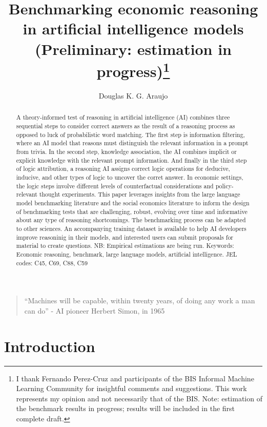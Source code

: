 \documentclass[
]{article}
\title{Benchmarking economic reasoning in artificial intelligence models
(Preliminary: estimation in progress)\thanks{I thank Fernando Perez-Cruz
and participants of the BIS Informal Machine Learning Community for
insightful comments and suggestions. This work represents my opinion and
not necessarily that of the BIS. Note: estimation of the benchmark
results in progress; results will be included in the first complete
draft.}}
\author{Douglas K. G. Araujo}
\affil{%
                  Bank for International
Settlements, douglas.araujo@bis.org
              }
\date{}
\begin{document}
\maketitle
\begin{abstract}
A theory-informed test of reasoning in artificial intelligence (AI)
combines three sequential steps to consider correct answers as the
result of a reasoning process as opposed to luck of probabilistic word
matching. The first step is information filtering, where an AI model
that reasons must distinguish the relevant information in a prompt from
trivia. In the second step, knowledge association, the AI combines
implicit or explicit knowledge with the relevant prompt information. And
finally in the third step of logic attribution, a reasoning AI assigns
correct logic operations for deducive, inducive, and other types of
logic to uncover the corret answer. In economic settings, the logic
steps involve different levels of counterfactual considerations and
policy-relevant thought experiments. This paper leverages insights from
the large language model benchmarking literature and the social
economics literature to inform the design of benchmarking tests that are
challenging, robust, evolving over time and informative about any type
of reasoning shortcomings. The benchmarking process can be adapted to
other sciences. An accompanying training dataset is available to help AI
developers improve reasoninig in their models, and interested users can
submit proposals for material to create questions. NB: Empirical
estimations are being run. Keywords: Economic reasoning, benchmark,
large language models, artificial intelligence. JEL codes: C45, C69,
C88, C59
\end{abstract}

\begin{quote}
``Machines will be capable, within twenty years, of doing any work a man
can do'' - AI pioneer Herbert Simon, in 1965
\end{quote}

\section{Introduction}\label{introduction}
\end{document}

